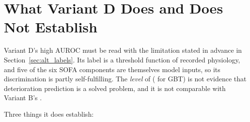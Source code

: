 \section{What Variant D Does and Does Not Establish}
\label{sec:variant_d_establishes}

Variant D's high AUROC must be read with the limitation stated in advance in
Section~\ref{sec:alt_labels}. Its label is a threshold function of recorded
physiology, and five of the six SOFA components are themselves model inputs, so
its discrimination is partly self-fulfilling. The \emph{level} of
\pcAltAurocFullPrimaryD{} (\pcAltAurocFullGbtD{} for GBT) is not evidence that
deterioration prediction is a solved problem, and it is not comparable with
Variant B's \pcAurocPrimaryB.

Three things it does establish:

